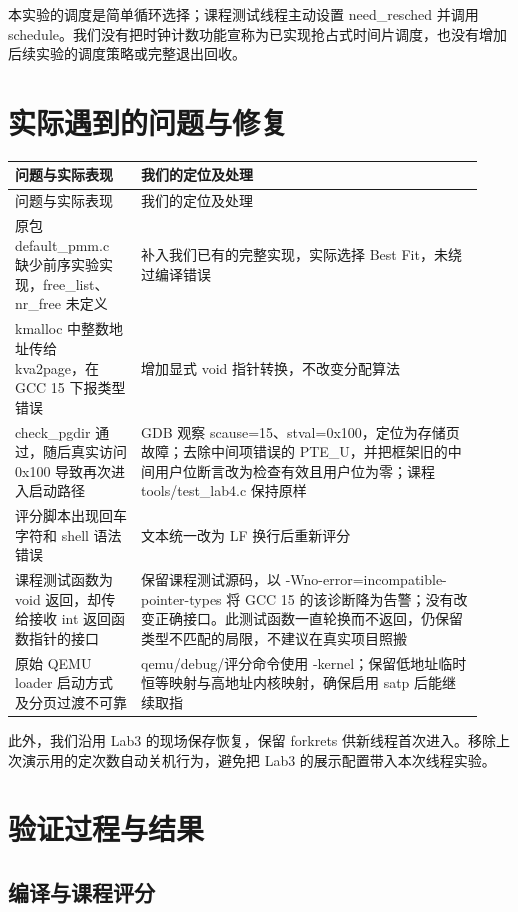\documentclass[UTF8,a4paper,10pt]{ctexart}
\begin{document}
本实验的调度是简单循环选择；课程测试线程主动设置 need\_resched 并调用 schedule。我们没有把时钟计数功能宣称为已实现抢占式时间片调度，也没有增加后续实验的调度策略或完整退出回收。


\section{实际遇到的问题与修复}

{\small
\setlength{\tabcolsep}{3pt}
\renewcommand{\arraystretch}{1.22}
\begin{longtable}{>{\raggedright\arraybackslash}p{0.25\linewidth}>{\raggedright\arraybackslash}p{0.68\linewidth}}
\toprule
问题与实际表现 & 我们的定位及处理 \\
\midrule\endfirsthead
问题与实际表现 & 我们的定位及处理 \\
\midrule\endhead
原包 default\_pmm.c 缺少前序实验实现，free\_list、nr\_free 未定义 & 补入我们已有的完整实现，实际选择 Best Fit，未绕过编译错误 \\
kmalloc 中整数地址传给 kva2page，在 GCC 15 下报类型错误 & 增加显式 void 指针转换，不改变分配算法 \\
check\_pgdir 通过，随后真实访问 0x100 导致再次进入启动路径 & GDB 观察 scause=15、stval=0x100，定位为存储页故障；去除中间项错误的 PTE\_U，并把框架旧的中间用户位断言改为检查有效且用户位为零；课程 tools/test\_lab4.c 保持原样 \\
评分脚本出现回车字符和 shell 语法错误 & 文本统一改为 LF 换行后重新评分 \\
课程测试函数为 void 返回，却传给接收 int 返回函数指针的接口 & 保留课程测试源码，以 -Wno-error=incompatible-pointer-types 将 GCC 15 的该诊断降为告警；没有改变正确接口。此测试函数一直轮换而不返回，仍保留类型不匹配的局限，不建议在真实项目照搬 \\
原始 QEMU loader 启动方式及分页过渡不可靠 & qemu/debug/评分命令使用 -kernel；保留低地址临时恒等映射与高地址内核映射，确保启用 satp 后能继续取指 \\
\bottomrule
\end{longtable}
}

此外，我们沿用 Lab3 的现场保存恢复，保留 forkrets 供新线程首次进入。移除上次演示用的定次数自动关机行为，避免把 Lab3 的展示配置带入本次线程实验。


\section{验证过程与结果}

\subsection{编译与课程评分}
\end{document}
